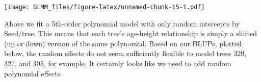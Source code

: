 \documentclass[
]{book}
\newenvironment{Shaded}{\begin{snugshade}}{\end{snugshade}}
\newcommand{\AttributeTok}[1]{\textcolor[rgb]{0.77,0.63,0.00}{#1}}
\newcommand{\ConstantTok}[1]{\textcolor[rgb]{0.00,0.00,0.00}{#1}}
\newcommand{\DecValTok}[1]{\textcolor[rgb]{0.00,0.00,0.81}{#1}}
\newcommand{\FloatTok}[1]{\textcolor[rgb]{0.00,0.00,0.81}{#1}}
\newcommand{\FunctionTok}[1]{\textcolor[rgb]{0.00,0.00,0.00}{#1}}
\newcommand{\NormalTok}[1]{#1}
\newcommand{\OtherTok}[1]{\textcolor[rgb]{0.56,0.35,0.01}{#1}}
\newcommand{\SpecialCharTok}[1]{\textcolor[rgb]{0.00,0.00,0.00}{#1}}
\newcommand{\StringTok}[1]{\textcolor[rgb]{0.31,0.60,0.02}{#1}}
\begin{document}
\begin{Shaded}
\end{Shaded}

\texttt{[image: GLMM\_files/figure-latex/unnamed-chunk-15-1.pdf]}

Above we fit a 5th-order polynomial model with only random intercepts by Seed/tree. This means that each tree's age-height relationship is simply a shifted (up or down) version of the same polynomial. Based on our BLUPs, plotted below, the random effects do not seem sufficiently flexible to model trees 329, 327, and 305, for example. It certainly looks like we need to add random polynomial effects.
\end{document}
